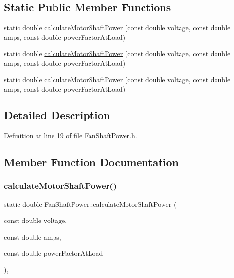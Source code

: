 \subsection*{Static Public Member Functions}
\begin{DoxyCompactItemize}
\item 
static double \hyperlink{class_fan_shaft_power_aa1928514508aed582dc9b11127b4546a}{calculate\+Motor\+Shaft\+Power} (const double voltage, const double amps, const double power\+Factor\+At\+Load)
\item 
static double \hyperlink{class_fan_shaft_power_aa1928514508aed582dc9b11127b4546a}{calculate\+Motor\+Shaft\+Power} (const double voltage, const double amps, const double power\+Factor\+At\+Load)
\item 
static double \hyperlink{class_fan_shaft_power_aa1928514508aed582dc9b11127b4546a}{calculate\+Motor\+Shaft\+Power} (const double voltage, const double amps, const double power\+Factor\+At\+Load)
\end{DoxyCompactItemize}


\subsection{Detailed Description}


Definition at line 19 of file Fan\+Shaft\+Power.\+h.



\subsection{Member Function Documentation}
\mbox{\label{class_fan_shaft_power_aa1928514508aed582dc9b11127b4546a}} 
\subsubsection{\texorpdfstring{calculate\+Motor\+Shaft\+Power()}{calculateMotorShaftPower()}\hspace{0.1cm}{\footnotesize\ttfamily [1/3]}}
{\footnotesize\ttfamily static double Fan\+Shaft\+Power\+::calculate\+Motor\+Shaft\+Power (\begin{DoxyParamCaption}\item[{const double}]{voltage,  }\item[{const double}]{amps,  }\item[{const double}]{power\+Factor\+At\+Load }\end{DoxyParamCaption})\hspace{0.3cm}{\ttfamily [inline]}, {\ttfamily [static]}}

